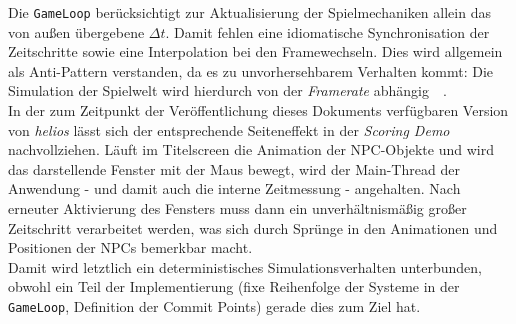 \vspace{5mm}
\begin{tcolorbox}[title={Technical Debt der GameLoop}]
    Die \texttt{GameLoop} berücksichtigt zur Aktualisierung der Spielmechaniken allein das von außen übergebene $\Delta t$.
    Damit fehlen eine idiomatische Synchronisation der Zeitschritte sowie eine Interpolation bei den Framewechseln.
    Dies wird allgemein als Anti-Pattern verstanden, da es zu unvorhersehbarem Verhalten kommt:
    Die Simulation der Spielwelt wird hierdurch von der \textit{Framerate} abhängig~\cite{FixYourTimestep}~\cite[S. 136]{Nys14}.\\

    In der zum Zeitpunkt der Veröffentlichung dieses Dokuments verfügbaren Version von \textit{helios} lässt sich der entsprechende Seiteneffekt in der \textit{Scoring Demo} nachvollziehen.
    Läuft im Titelscreen die Animation der NPC-Objekte und wird das darstellende Fenster mit der Maus bewegt, wird der Main-Thread der Anwendung - und damit auch die interne Zeitmessung - angehalten.
    Nach erneuter Aktivierung des Fensters muss dann ein unverhältnismäßig großer Zeitschritt verarbeitet werden, was sich durch Sprünge in den Animationen und Positionen der NPCs bemerkbar macht.\\

    Damit wird letztlich ein deterministisches Simulationsverhalten unterbunden, obwohl ein Teil der Implementierung (fixe Reihenfolge der Systeme in der \texttt{GameLoop}, Definition der Commit Points) gerade dies zum Ziel hat.
\end{tcolorbox}
\vspace{5mm}